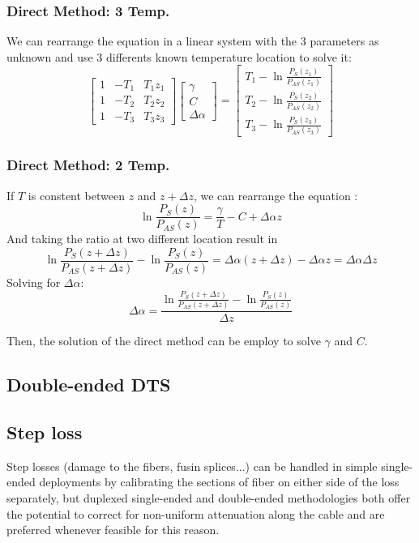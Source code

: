 \documentclass[twocolumn]{article}
\numberwithin{equation}{section}
\begin{document}
	\subsubsection{Direct Method: 3 Temp.}
We can rearrange the equation in a linear system with the 3 parameters as unknown and use 3 differents known temperature location to solve it:
$$
\begin{bmatrix}
 1 & -T_1 & T_1z_1\\ 
 1 & -T_2 & T_2z_2\\
 1 & -T_3 & T_3z_3
 \end{bmatrix}
 \begin{bmatrix}
 \gamma\\ 
 C\\
 \Delta \alpha
 \end{bmatrix}
 =
 \begin{bmatrix}
 T_1 - \ln \frac{P_S(z_1)}{P_{AS}(z_1)}\\ 
 T_2 - \ln \frac{P_S(z_2)}{P_{AS}(z_2)}\\
 T_3 - \ln \frac{P_S(z_3)}{P_{AS}(z_3)}
 \end{bmatrix}
$$


	\subsubsection{Direct Method: 2 Temp.}
If $T$ is constent between $z$ and $z+\Delta z$, we can rearrange the equation :
$$ \ln\frac{P_S(z)}{P_{AS}(z)}  = \frac{\gamma}{T} - C + \Delta\alpha z$$
And taking the ratio at two different location result in
$$ \ln\frac{P_S(z+\Delta z)}{P_{AS}(z+\Delta z)} -\ln\frac{P_S(z)}{P_{AS}(z)} = \Delta\alpha (z+\Delta z) - \Delta\alpha z = \Delta\alpha \Delta z$$
 Solving for $\Delta \alpha$:
$$\Delta \alpha=\frac{ \ln\frac{P_S(z+\Delta z)}{P_{AS}(z+\Delta z)} -\ln\frac{P_S(z)}{P_{AS}(z)}}{\Delta z}$$

Then, the solution of the direct method can be employ to solve $\gamma$ and $C$.




\subsection{Double-ended DTS}

\subsection{Step loss}
Step losses (damage to the fibers, fusin splices...) can be handled in simple single-ended deployments by calibrating the sections of fiber on either side of the loss separately, but duplexed single-ended and double-ended methodologies both offer the potential to correct for non-uniform attenuation along the cable and are preferred whenever feasible for this reason.







\newpage
\nocite{*}
	
	
\end{document}
